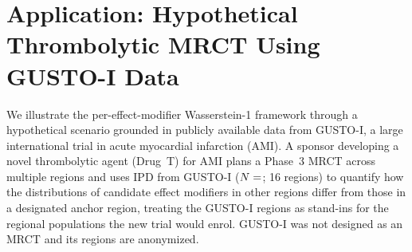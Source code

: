 \documentclass[AMA,Times1COL]{WileyNJDv5}
\begin{document}




\section{Application: Hypothetical Thrombolytic MRCT Using GUSTO-I Data}\label{sec:application}

We illustrate the per-effect-modifier Wasserstein-1 framework through a hypothetical scenario grounded in publicly available data from GUSTO-I, a large international trial in acute myocardial infarction (AMI). A sponsor developing a novel thrombolytic agent (Drug~T) for AMI plans a Phase~3 MRCT across multiple regions and uses IPD from GUSTO-I ($N = \numval{gustoN}$; 16 regions)\cite{gusto1993} to quantify how the distributions of candidate effect modifiers in other regions differ from those in a designated anchor region, treating the GUSTO-I regions as stand-ins for the regional populations the new trial would enrol. GUSTO-I was not designed as an MRCT and its regions are anonymized.
\end{document}
